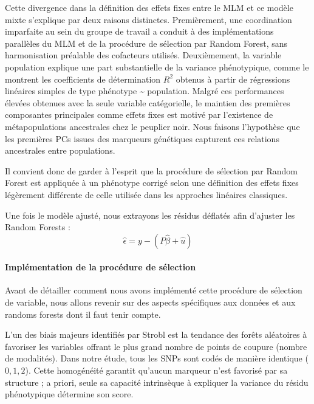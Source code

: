 \documentclass[
  11pt,
  letterpaper,
  DIV=11,
  numbers=noendperiod]{scrartcl}
\let\oldparagraph\paragraph
\renewcommand{\paragraph}[1]{\oldparagraph{#1}\mbox{}}
\begin{document}
Cette divergence dans la définition des effets fixes entre le MLM et ce
modèle mixte s'explique par deux raisons distinctes. Premièrement, une
coordination imparfaite au sein du groupe de travail a conduit à des
implémentations parallèles du MLM et de la procédure de sélection par
Random Forest, sans harmonisation préalable des cofacteurs utilisés.
Deuxièmement, la variable population explique une part substantielle de
la variance phénotypique, comme le montrent les coefficients de
détermination \(R^2\) obtenus à partir de régressions linéaires simples
de type phénotype \textasciitilde{} population. Malgré ces performances
élevées obtenues avec la seule variable catégorielle, le maintien des
premières composantes principales comme effets fixes est motivé par
l'existence de métapopulations ancestrales chez le peuplier noir. Nous
faisons l'hypothèse que les premières PCs issues des marqueurs
génétiques capturent ces relations ancestrales entre populations.

Il convient donc de garder à l'esprit que la procédure de sélection par
Random Forest est appliquée à un phénotype corrigé selon une définition
des effets fixes légèrement différente de celle utilisée dans les
approches linéaires classiques.

Une fois le modèle ajusté, nous extrayons les résidus déflatés afin
d'ajuster les Random Forests :
\[\hat{\epsilon} = y - (P\hat{\beta} + \hat{u})\]

\hypertarget{impluxe9mentation-de-la-procuxe9dure-de-suxe9lection}{%
\paragraph{Implémentation de la procédure de
sélection}\label{impluxe9mentation-de-la-procuxe9dure-de-suxe9lection}}

Avant de détailler comment nous avons implémenté cette procédure de
sélection de variable, nous allons revenir sur des aspects spécifiques
aux données et aux randoms forests dont il faut tenir compte.

L'un des biais majeurs identifiés par Strobl est la tendance des forêts
aléatoires à favoriser les variables offrant le plus grand nombre de
points de coupure (nombre de modalités). Dans notre étude, tous les SNPs
sont codés de manière identique (\(0, 1, 2\)). Cette homogénéité
garantit qu'aucun marqueur n'est favorisé par sa structure ; a priori,
seule sa capacité intrinsèque à expliquer la variance du résidu
phénotypique détermine son score.
\end{document}
